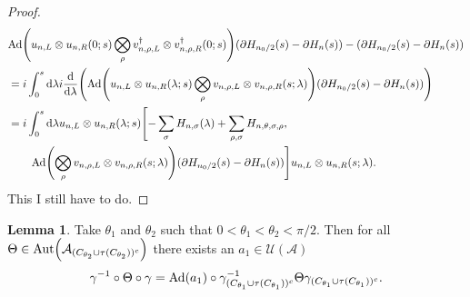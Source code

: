 \documentclass[12pt,a4paper,twoside]{article}
\renewcommand{\d}{\text{d}}
\let\originalleft\left
\let\originalright\right
\renewcommand{\left}{\mathopen{}\mathclose\bgroup\originalleft}
\renewcommand{\right}{\aftergroup\egroup\originalright}
\newcommand{\UU}{\mathcal U}
\renewcommand{\AA}{\mathcal A}
\newcommand{\Ad}[1]{\textrm{Ad}\left(#1\right)}
\newcommand{\Aut}[1]{\textrm{Aut}\left(#1\right)}
\theoremstyle{definition}
\newtheorem{lemma}[theorem]{Lemma}
\numberwithin{equation}{section}
\begin{document}
\begin{proof}
 	\begin{align}
 	&\Ad{u_{n,L}\otimes u_{n,R}(0;s) \bigotimes_\rho v_{n,\rho,L}^\dagger\otimes v_{n,\rho,R}^\dagger(0;s)}(\partial H_{n_0/2}(s)-\partial H_{n}(s))-(\partial H_{n_0/2}(s)-\partial H_{n}(s))\\
 	&=i\int_0^s\d \lambda i\frac{\d}{\d\lambda}\left(\Ad{u_{n,L}\otimes u_{n,R}(\lambda;s)\bigotimes_\rho v_{n,\rho,L}\otimes v_{n,\rho,R}(s;\lambda)}(\partial H_{n_0/2}(s)-\partial H_{n}(s))\right)\\
 	&=i\int_0^s \d\lambda u_{n,L}\otimes u_{n,R}(\lambda;s)\left[-\sum_\sigma H_{n,\sigma}(\lambda)+\sum_{\rho,\sigma} H_{n,\theta,\sigma,\rho},\right.\\
 	\nonumber
 	&\qquad\left.\Ad{\bigotimes_\rho v_{n,\rho,L}\otimes v_{n,\rho,R}(s;\lambda)}(\partial H_{n_0/2}(s)-\partial H_{n}(s))\right]u_{n,L}\otimes u_{n,R}(s;\lambda).
 	\end{align}
 	{\color{red}This I still have to do.}
 \end{proof}
\begin{lemma}\label{lem:TwoAngleLemmaPart1}
	Take $\theta_1$ and $\theta_2$ such that $0<\theta_1<\theta_2<\pi/2$. Then for all $\Theta\in\Aut{\AA_{(C_{\theta_2}\cup \tau(C_{\theta_2}))^c}}$ there exists an $a_1\in\UU(\AA)$
		\begin{equation}\label{eq:TwoAngleLemmaPart1Equation1}
			\gamma^{-1}\circ\Theta\circ\gamma=\Ad{a_1}\circ\gamma_{(C_{\theta_1}\cup \tau(C_{\theta_1}))^c}^{-1}\Theta\gamma_{(C_{\theta_1}\cup \tau(C_{\theta_1}))^c}.
		\end{equation}
\end{lemma}
\end{document}
